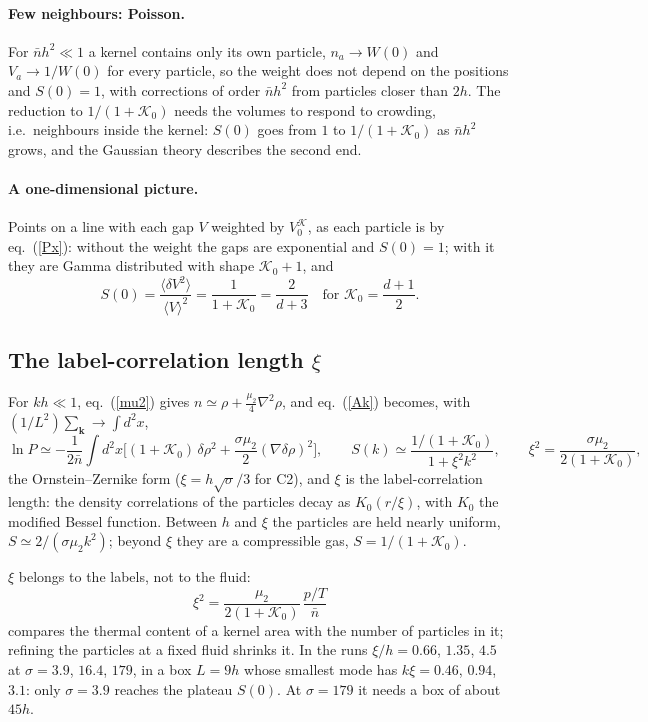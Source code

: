 \documentclass[11pt,aps,preprint,nofootinbib,superscriptaddress,tightenlines]{revtex4-2}
\newcommand{\avg}[1]{\langle #1\rangle}
\def\st{\begin{equation}}
\def\stp{\end{equation}}
\def\Eq#1{eq.~(\ref{#1})}
\let\oldparagraph\paragraph
\renewcommand{\paragraph}{\par\bigskip\oldparagraph}
\begin{document}
\paragraph{Few neighbours: Poisson.}  For $\bar nh^2\ll1$ a kernel contains only its own particle, $n_a\to W(0)$ and $V_a\to1/W(0)$ for every
particle, so the weight does not depend on the positions and $S(0)=1$, with corrections of order $\bar nh^2$ from particles closer than $2h$.  The
reduction to $1/(1+\mathcal K_0)$ needs the volumes to respond to crowding, i.e.\ neighbours inside the kernel: $S(0)$ goes from $1$ to $1/(1+\mathcal K_0)$ as $\bar nh^2$
grows, and the Gaussian theory describes the second end.

\paragraph{A one-dimensional picture.}  Points on a line with each gap $V$ weighted by $V^\mathcal K_0$, as each particle is by \Eq{Px}: without the weight the
gaps are exponential and $S(0)=1$; with it they are Gamma distributed with shape $\mathcal K_0+1$, and
\st
S(0)=\frac{\avg{\delta V^2}}{\avg V^2}=\frac1{1+\mathcal K_0}=\frac{2}{d+3}\quad\text{for }\mathcal K_0=\frac{d+1}2 .
\stp

\subsection{The label-correlation length $\xi$}

For $kh\ll1$, \Eq{mu2} gives $n\simeq\rho+\tfrac{\mu_2}4\nabla^2\rho$, and \Eq{Ak} becomes, with $(1/L^2)\sum_{\bm k}\to\int d^2x$,
\st
\ln P\simeq-\frac1{2\bar n}\int d^2x\Big[(1+\mathcal K_0)\,\delta\rho^2+\frac{\sigma\mu_2}{2}(\nabla\delta\rho)^2\Big],\qquad
S(k)\simeq\frac{1/(1+\mathcal K_0)}{1+\xi^2k^2},\qquad \xi^2=\frac{\sigma\mu_2}{2(1+\mathcal K_0)},
\stp
the Ornstein--Zernike form ($\xi=h\sqrt\sigma/3$ for C2), and $\xi$ is the label-correlation length: the density correlations of the
particles decay as $K_0(r/\xi)$, with $K_0$ the modified Bessel function.  Between $h$ and $\xi$ the particles are held nearly uniform,
$S\simeq2/(\sigma\mu_2k^2)$; beyond $\xi$ they are a compressible gas, $S=1/(1+\mathcal K_0)$.

$\xi$ belongs to the labels, not to the fluid:
\st
\xi^2=\frac{\mu_2}{2(1+\mathcal K_0)}\,\frac{p/T}{\bar n}
\stp
compares the thermal content of a kernel area with the number of particles in it; refining the particles at a fixed fluid shrinks it.
In the runs $\xi/h=0.66$, $1.35$, $4.5$ at $\sigma=3.9$, $16.4$, $179$, in a box $L=9h$ whose smallest mode has $k\xi=0.46$, $0.94$, $3.1$: only
$\sigma=3.9$ reaches the plateau $S(0)$.  At $\sigma=179$ it needs a box of about $45h$.
\end{document}
